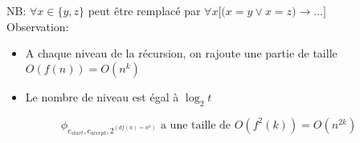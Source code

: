 \documentclass[a4paper,12pt]{article}
\begin{document}
    NB: $\forall x \in \big\{y, z\big\}$ peut être remplacé par $\forall x \Big[\big( x = y \vee x = z\big) \rightarrow ... \Big]$\\
    
    Observation:
    \begin{itemize}
     \item A chaque niveau de la récursion, on rajoute une partie de taille $O(f(n)) = O(n^k)$
     \item Le nombre de niveau est égal à $\log_2 t$
    \end{itemize}

    $$\phi_{c_{start}, c_{accept}, 2^{(df(n) = n^k)}} \text{ a une taille de } O(f^2(k)) = O(n^{2k})$$
    
    
    
    
    
\end{document}
